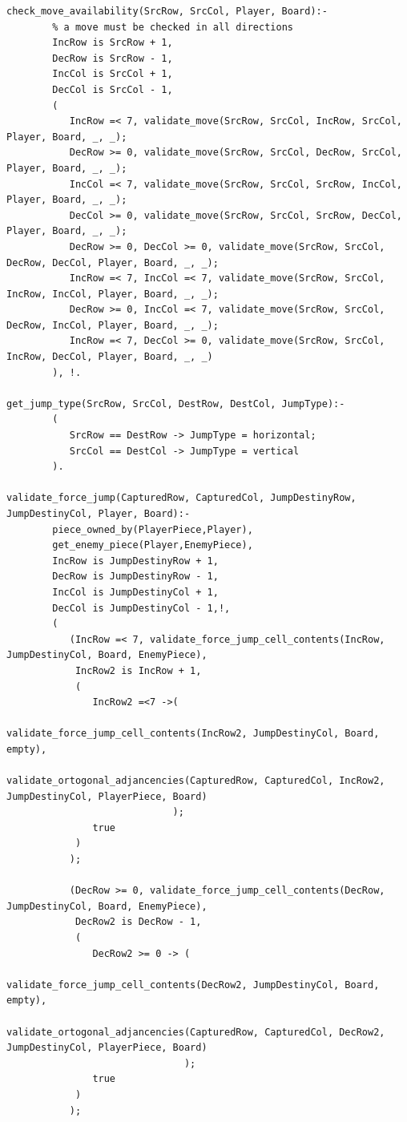 \documentclass[a4paper]{article}
\begin{document}
\begin{lstlisting}[style=customprologwithlines]
check_move_availability(SrcRow, SrcCol, Player, Board):-
        % a move must be checked in all directions
        IncRow is SrcRow + 1,
        DecRow is SrcRow - 1,
        IncCol is SrcCol + 1,
        DecCol is SrcCol - 1,
        (
           IncRow =< 7, validate_move(SrcRow, SrcCol, IncRow, SrcCol, Player, Board, _, _);
           DecRow >= 0, validate_move(SrcRow, SrcCol, DecRow, SrcCol, Player, Board, _, _);
           IncCol =< 7, validate_move(SrcRow, SrcCol, SrcRow, IncCol, Player, Board, _, _);
           DecCol >= 0, validate_move(SrcRow, SrcCol, SrcRow, DecCol, Player, Board, _, _);
           DecRow >= 0, DecCol >= 0, validate_move(SrcRow, SrcCol, DecRow, DecCol, Player, Board, _, _);
           IncRow =< 7, IncCol =< 7, validate_move(SrcRow, SrcCol, IncRow, IncCol, Player, Board, _, _);
           DecRow >= 0, IncCol =< 7, validate_move(SrcRow, SrcCol, DecRow, IncCol, Player, Board, _, _);
           IncRow =< 7, DecCol >= 0, validate_move(SrcRow, SrcCol, IncRow, DecCol, Player, Board, _, _)
        ), !.

get_jump_type(SrcRow, SrcCol, DestRow, DestCol, JumpType):-
        (
           SrcRow == DestRow -> JumpType = horizontal;
           SrcCol == DestCol -> JumpType = vertical
        ).

validate_force_jump(CapturedRow, CapturedCol, JumpDestinyRow, JumpDestinyCol, Player, Board):-
        piece_owned_by(PlayerPiece,Player),
        get_enemy_piece(Player,EnemyPiece),
        IncRow is JumpDestinyRow + 1,
        DecRow is JumpDestinyRow - 1,
        IncCol is JumpDestinyCol + 1,
        DecCol is JumpDestinyCol - 1,!,
        (
           (IncRow =< 7, validate_force_jump_cell_contents(IncRow, JumpDestinyCol, Board, EnemyPiece),
            IncRow2 is IncRow + 1,
            (
               IncRow2 =<7 ->(
                                validate_force_jump_cell_contents(IncRow2, JumpDestinyCol, Board, empty),
                                validate_ortogonal_adjancencies(CapturedRow, CapturedCol, IncRow2, JumpDestinyCol, PlayerPiece, Board)
                             );
               true
            )
           );

           (DecRow >= 0, validate_force_jump_cell_contents(DecRow, JumpDestinyCol, Board, EnemyPiece),
            DecRow2 is DecRow - 1,
            (
               DecRow2 >= 0 -> (
                                  validate_force_jump_cell_contents(DecRow2, JumpDestinyCol, Board, empty),
                                  validate_ortogonal_adjancencies(CapturedRow, CapturedCol, DecRow2, JumpDestinyCol, PlayerPiece, Board)
                               ); 
               true
            )
           );


\end{lstlisting}
\end{document}
